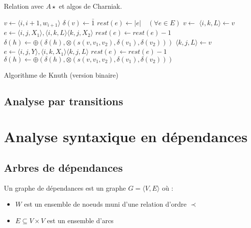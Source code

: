 \documentclass[11pt,openany]{book}
\begin{document}
Relation avec $A\star$ et algos de Charniak.



\begin{algorithm}
\begin{algorithmic}[htbp]
\State $v \gets \langle i,i+1,w_{i+1} \rangle$
\State $\delta(v) \gets \bar{1}$
\State  {}
\EndFor
\State   $rest(e) \gets |e| \quad (\forall e \in E)$ 
\State $v \gets $ 
\State $\langle i , k , L \rangle \gets v$
\State $e \gets \langle i,j , X_1 \rangle , \langle i , k , L \rangle \langle k , j , X_2 \rangle$
\State $rest(e) \gets rest(e) - 1$
\State $\delta(h) \gets \oplus( \delta(h),  \otimes(s(v,v_1,v_2),\delta(v_1),\delta(v_2)))$
\State {}
\EndIf
\EndFor
\EndFor
\State $\langle k , j , L \rangle \gets v$
\State $e \gets \langle i,j , Y \rangle , \langle i , k , X_1 \rangle \langle k , j , L \rangle$
\State $rest(e) \gets rest(e) - 1$
\State $\delta(h) \gets \oplus( \delta(h),  \otimes(s(v,v_1,v_2),\delta(v_1),\delta(v_2)))$
\State {}
\EndIf
\EndFor
\EndFor
\EndWhile
\EndFunction
\end{algorithmic}
\caption{\label{algo-knuth-verbose} Algorithme de Knuth (version binaire)}
\end{algorithm}
\section{Analyse par transitions}





\chapter{Analyse syntaxique en dépendances}

\section{Arbres de dépendances}

Un graphe de dépendances est un graphe $G = \langle V,E \rangle $
où :
\begin{itemize}
\item $W$ est un ensemble de noeuds muni d'une relation d'ordre $\prec$
\item $E \subseteq V\times V$  est un ensemble d'arcs 
\end{itemize}
\end{document}
